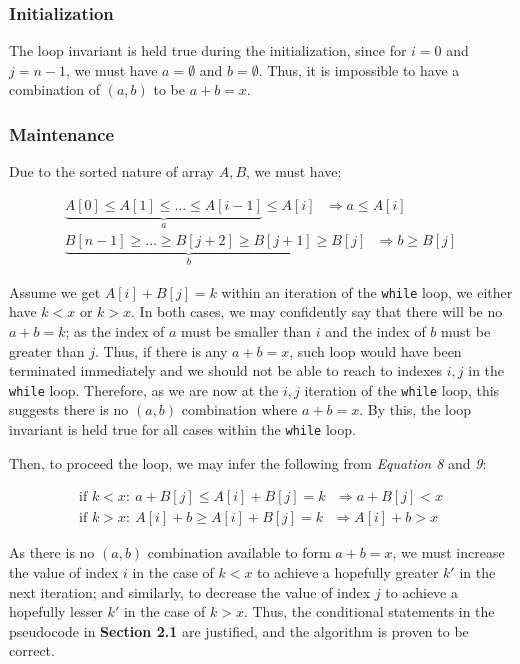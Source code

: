 \documentclass[12pt]{article}
\newcommand{\inlinecode}{\texttt}
\begin{document}
\subsubsection{Initialization}
The loop invariant is held true during the initialization, since for $i = 0$ and $j = n-1$, we must have $a = \emptyset$ and $b = \emptyset$. Thus, it is impossible to have a combination of $(a, b)$ to be $a + b = x$.

\subsubsection{Maintenance}

Due to the sorted nature of array $A, B$, we must have:

\begin{gather}
    \underbrace{A[0] \leq A[1] \leq ... \leq A[i-1]}_{a} \leq A[i]  \ \ \ \Rightarrow a \leq A[i]\\
    \underbrace{B[n-1] \geq ... \geq B[j+2] \geq B[j+1]}_{b} \geq B[j] \ \ \ \Rightarrow b \geq B[j]
\end{gather}

Assume we get $A[i] + B[j] = k$ within an iteration of the \inlinecode{while} loop, we either have $k < x$ or $k > x$. In both cases, we may confidently say that there will be no $a + b = k$; as the index of $a$ must be smaller than $i$ and the index of $b$ must be greater than $j$. Thus, if there is any $a + b = x$, such loop would have been terminated immediately and we should not be able to reach to indexes $i, j$ in the \inlinecode{while} loop. Therefore, as we are now at the $i, j$ iteration of the \inlinecode{while} loop, this suggests there is no $(a, b)$ combination where $a + b = x$. By this, the loop invariant is held true for all cases within the \inlinecode{while} loop.\newline

Then, to proceed the loop, we may infer the following from \textit{Equation 8} and \textit{9}:

\begin{gather}
    \text{if } k < x: \ a + B[j] \leq A[i] + B[j] = k  \ \ \ \Rightarrow a + B[j] < x\\
    \text{if } k > x: \ A[i] + b \geq A[i] + B[j] = k  \ \ \ \Rightarrow A[i] + b > x
\end{gather}

As there is no $(a, b)$ combination available to form $a+b = x$, we must increase the value of index $i$ in the case of $k < x$ to achieve a hopefully greater $k'$ in the next iteration; and similarly, to decrease the value of index $j$ to achieve a hopefully lesser $k'$ in the case of $k > x$. Thus, the conditional statements in the pseudocode in \textbf{Section 2.1} are justified, and the algorithm is proven to be correct.
\end{document}
